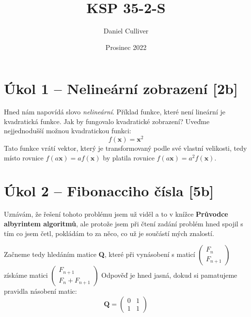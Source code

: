 \documentclass{../../../ksp}
\title{KSP 35-2-S}
\author{Daniel Culliver}
\date{Prosinec 2022}
\begin{document}
\maketitle

\section*{Úkol 1 – Nelineární zobrazení [2b]}
Hned nám napovídá slovo \emph{nelineární}. Příklad funkce, které není lineární je kvadratická funkce.
Jak by fungovalo kvadratické zobrazení? Uveďme nejjednodušší možnou kvadratickou funkci:
\begin{equation*}
    f(\mathbf{x}) = \mathbf{x}^2
\end{equation*}
Tato funkce vrátí vektor, který je transformovaný podle své vlastní velikosti, tedy místo rovnice
$f(a\mathbf{x}) = af(\mathbf{x})$ by platila rovnice $f(a\mathbf{x}) = a^2f(\mathbf{x})$.

\section*{Úkol 2 – Fibonacciho čísla [5b]}
Uznávám, že řešení tohoto problému jsem už viděl a to v knížce \textbf{Průvodce albyrintem algoritmů},
ale protože jsem při čtení zadání problém hned spojil s tím co jsem četl, pokládám to za něco, co už je součástí mých znalostí.

\noindent
Začneme tedy hledáním matice \textbf{Q}, které při vynásobení s maticí
$\begin{pmatrix}
    F_n\\
    F_{n+1}
\end{pmatrix}$
získáme matici
$\begin{pmatrix}
    F_{n+1}\\
    F_n + F_{n+1}
\end{pmatrix}$
Odpověď je hned jasná, dokud si pamatujeme pravidla násobení matic:
\begin{equation*}
    \mathbf{Q} =
    \begin{pmatrix}
        0 & 1\\
        1 & 1
    \end{pmatrix}
\end{equation*}
\end{document}

